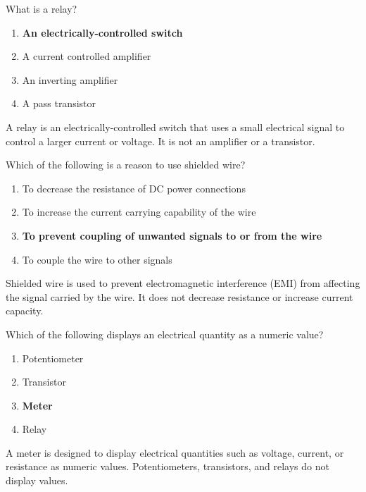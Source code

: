 
\begin{tcolorbox}[colback=gray!10!white,colframe=black!75!black,title={T6D02}]
    What is a relay?
    \begin{enumerate}[label=\Alph*,noitemsep]
        \item \textbf{An electrically-controlled switch}
        \item A current controlled amplifier
        \item An inverting amplifier
        \item A pass transistor
    \end{enumerate}
\end{tcolorbox}
A relay is an electrically-controlled switch that uses a small electrical signal to control a larger current or voltage. It is not an amplifier or a transistor.


\begin{tcolorbox}[colback=gray!10!white,colframe=black!75!black,title={T6D03}]
    Which of the following is a reason to use shielded wire?
    \begin{enumerate}[label=\Alph*,noitemsep]
        \item To decrease the resistance of DC power connections
        \item To increase the current carrying capability of the wire
        \item \textbf{To prevent coupling of unwanted signals to or from the wire}
        \item To couple the wire to other signals
    \end{enumerate}
\end{tcolorbox}
Shielded wire is used to prevent electromagnetic interference (EMI) from affecting the signal carried by the wire. It does not decrease resistance or increase current capacity.


\begin{tcolorbox}[colback=gray!10!white,colframe=black!75!black,title={T6D04}]
    Which of the following displays an electrical quantity as a numeric value?
    \begin{enumerate}[label=\Alph*,noitemsep]
        \item Potentiometer
        \item Transistor
        \item \textbf{Meter}
        \item Relay
    \end{enumerate}
\end{tcolorbox}
A meter is designed to display electrical quantities such as voltage, current, or resistance as numeric values. Potentiometers, transistors, and relays do not display values.

